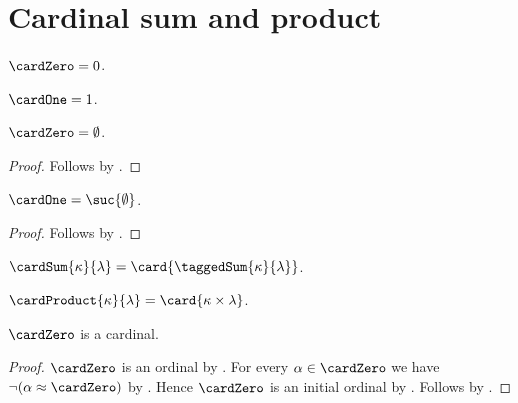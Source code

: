 


\section{Cardinal sum and product}

\begin{definition}\label{cardinal_zero}
    $\cardZero=0$.
\end{definition}

\begin{definition}\label{cardinal_one}
    $\cardOne=1$.
\end{definition}

\begin{proposition}\label{cardinal_zero_emptyset}
    $\cardZero=\emptyset$.
\end{proposition}
\begin{proof}
    Follows by .
\end{proof}

\begin{proposition}\label{cardinal_one_successor}
    $\cardOne=\suc{\emptyset}$.
\end{proposition}
\begin{proof}
    Follows by .
\end{proof}

\begin{definition}\label{cardinal_sum}
    $\cardSum{\kappa}{\lambda}
        =\card{\taggedSum{\kappa}{\lambda}}$.
\end{definition}

\begin{definition}\label{cardinal_product}
    $\cardProduct{\kappa}{\lambda}=\card{\kappa\times\lambda}$.
\end{definition}

\begin{proposition}\label{cardinal_zero_is_cardinal}
    $\cardZero$ is a cardinal.
\end{proposition}
\begin{proof}
    $\cardZero$ is an ordinal by
        .
    For every $\alpha\in\cardZero$ we have
        $\lnot(\alpha\approx\cardZero)$ by .
    Hence $\cardZero$ is an initial ordinal by .
    Follows by .
\end{proof}

